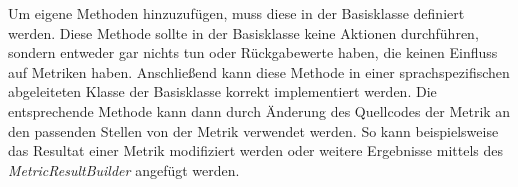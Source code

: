 Um eigene Methoden hinzuzufügen, muss diese in der Basisklasse definiert werden. Diese Methode sollte in der Basisklasse keine Aktionen durchführen, sondern entweder gar nichts tun oder Rückgabewerte haben, die keinen Einfluss auf Metriken haben. Anschließend kann diese Methode in einer sprachspezifischen abgeleiteten Klasse der Basisklasse korrekt implementiert werden. Die entsprechende Methode kann dann durch Änderung des Quellcodes der Metrik an den passenden Stellen von der Metrik verwendet werden. So kann beispielsweise das Resultat einer Metrik modifiziert werden oder weitere Ergebnisse mittels des \textit{MetricResultBuilder} angefügt werden.





